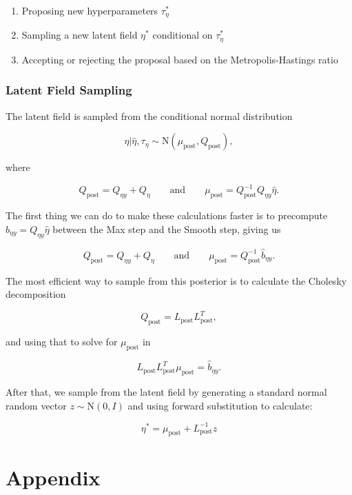 \documentclass[
  letterpaper,
  DIV=11,
  numbers=noendperiod]{scrartcl}
\providecommand{\tightlist}{%
  \setlength{\itemsep}{0pt}\setlength{\parskip}{0pt}}\usepackage{longtable,booktabs,array}
\begin{document}
\begin{enumerate}
\def\labelenumi{\arabic{enumi}.}
\tightlist
\item
  Proposing new hyperparameters \(\tau_\eta^*\)
\item
  Sampling a new latent field \(\eta^*\) conditional on \(\tau_\eta^*\)
\item
  Accepting or rejecting the proposal based on the Metropolis-Hastings
  ratio
\end{enumerate}

\subsubsection{Latent Field Sampling}\label{latent-field-sampling}

The latent field is sampled from the conditional normal distribution

\[
\eta \vert \hat\eta, \tau_\eta \sim \mathrm{N}(\mu_{\text{post}}, Q_{\text{post}}),
\]

where

\[
Q_{\text{post}} = Q_{\eta y} + Q_\eta
\qquad
\text{and}
\qquad
\mu_{\text{post}} = Q_{\text{post}}^{-1}Q_{\eta y}\hat\eta.
\]

The first thing we can do to make these calculations faster is to
precompute \(\hat b_{\eta y} = Q_{\eta y} \hat \eta\) between the Max
step and the Smooth step, giving us

\[
Q_{\text{post}} = Q_{\eta y} + Q_\eta
\qquad
\text{and}
\qquad
\mu_{\text{post}} = Q_{\text{post}}^{-1}\hat b_{\eta y}.
\]

The most efficient way to sample from this posterior is to calculate the
Cholesky decomposition

\[
Q_{\text{post}} = L_{\text{post}}L_{\text{post}}^T,
\]

and using that to solve for \(\mu_\text{post}\) in

\[
L_{\text{post}}L_{\text{post}}^T \mu_\text{post} = \hat b_{\eta y}.
\]

After that, we sample from the latent field by generating a standard
normal random vector \(z \sim \mathrm N(0, I)\) and using forward
substitution to calculate:

\[
\eta^* = \mu_\text{post} + L_\text{post}^{-1}z
\]

\section{Appendix}\label{appendix}
\end{document}
